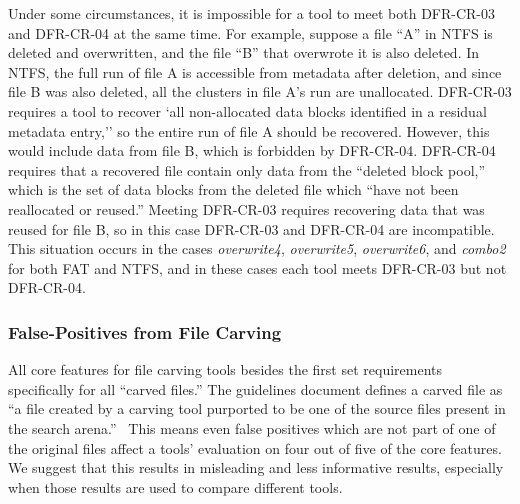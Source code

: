 Under some circumstances, it is impossible for a tool to meet both DFR-CR-03 and DFR-CR-04 at the same time.
For example, suppose a file ``A'' in NTFS is deleted and overwritten, and the file ``B'' that overwrote it is also deleted.
In NTFS, the full run of file A is accessible from metadata after deletion, and since file B was also deleted, all the clusters in file A's run are unallocated.
DFR-CR-03 requires a tool to recover `all non-allocated data blocks identified in a residual metadata entry,''\cite{meta:dfr:standards} so the entire run of file A should be recovered.
However, this would include data from file B, which is forbidden by DFR-CR-04.
DFR-CR-04 requires that a recovered file contain only data from the ``deleted block pool,'' which is the set of data blocks from the deleted file which ``have not been reallocated or reused.''\cite{meta:dfr:standards}
Meeting DFR-CR-03 requires recovering data that was reused for file B, so in this case DFR-CR-03 and DFR-CR-04 are incompatible.
This situation occurs in the cases \emph{overwrite4}, \emph{overwrite5}, \emph{overwrite6}, and \emph{combo2} for both FAT and NTFS, and in these cases each tool meets DFR-CR-03 but not DFR-CR-04.



\subsubsection{False-Positives from File Carving} \label{sec:false_pos}

All core features for file carving tools besides the first set requirements specifically for all ``carved files.''
The guidelines document defines a carved file as ``a file created by a carving tool purported to be one of the source files present in the search arena.''~\cite{carving_standards}
This means even false positives which are not part of one of the original files affect a tools' evaluation on four out of five of the core features.
We suggest that this results in misleading and less informative results, especially when those results are used to compare different tools.
 
